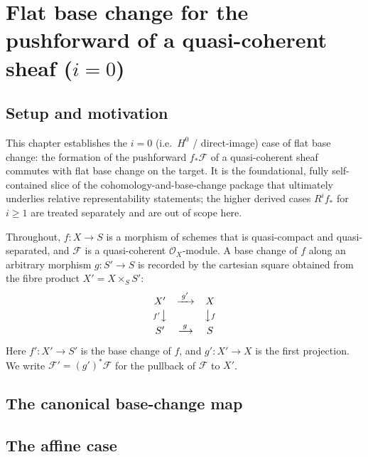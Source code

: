 \chapter{Flat base change for the pushforward of a quasi-coherent sheaf ($i=0$)}
\label{chap:Cohomology_FlatBaseChange}

\section{Setup and motivation}

This chapter establishes the $i=0$ (i.e.\ \(H^0\) / direct-image) case of flat
base change: the formation of the pushforward \(f_*\mathcal{F}\) of a
quasi-coherent sheaf commutes with flat base change on the target. It is the
foundational, fully self-contained slice of the cohomology-and-base-change
package that ultimately underlies relative representability statements; the
higher derived cases \(R^i f_*\) for \(i \geq 1\) are treated separately and are
out of scope here.

Throughout, \(f : X \to S\) is a morphism of schemes that is quasi-compact and
quasi-separated, and \(\mathcal{F}\) is a quasi-coherent \(\mathcal{O}_X\)-module.
A base change of \(f\) along an arbitrary morphism \(g : S' \to S\) is recorded
by the cartesian square obtained from the fibre product
\(X' = X \times_S S'\):
\[
  \begin{array}{ccc}
    X' & \xrightarrow{\;g'\;} & X \\[2pt]
    {\scriptstyle f'}\big\downarrow & & \big\downarrow{\scriptstyle f} \\[2pt]
    S' & \xrightarrow{\;g\;} & S
  \end{array}
\]
Here \(f' : X' \to S'\) is the base change of \(f\), and \(g' : X' \to X\) is the
first projection. We write \(\mathcal{F}' = (g')^*\mathcal{F}\) for the pullback
of \(\mathcal{F}\) to \(X'\).

\section{The canonical base-change map}


\section{The affine case}

